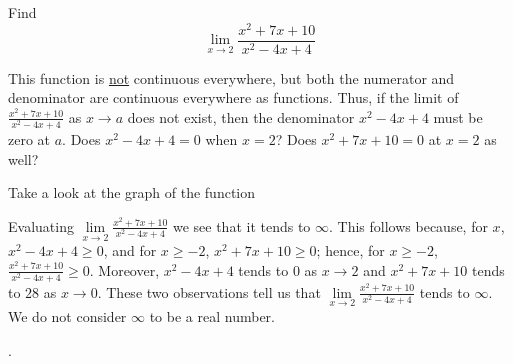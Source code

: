 \documentclass{ximera}
\begin{document}
\begin{question}
  Find 
  \[
  \displaystyle \lim_{x\to 2} \frac{x^2+7x+10}{x^2-4x+4}
  \]
  \begin{solution}
    \begin{hint}
     This function is \underline{not} continuous everywhere, but both the numerator and denominator are continuous everywhere as functions. Thus, if the limit of $\frac{x^2+7x+10}{x^2-4x+4}$ as $x\to{a}$ does not exist, then the denominator $x^2-4x+4$ must be zero at $a$. Does $x^2-4x+4=0$ when $x=2$? Does $x^2+7x+10=0$ at $x=2$ as well?
    \end{hint}
     \begin{hint}
    	Take a look at the graph of the function
    \begin{center}
      \end{center} 
    \end{hint}
    \begin{hint}
     Evaluating $\lim\limits_{x\to2}\frac{x^2+7x+10}{x^2-4x+4}$ we see that it tends to $\infty$. This follows because, for $x$, $x^2-4x+4\ge0$, and for $x\ge-2$, $x^2+7x+10\ge0$; hence, for $x\ge-2$, $\frac{x^2+7x+10}{x^2-4x+4}\ge0$. Moreover, $x^2-4x+4$ tends to $0$ as $x\to{2}$ and $x^2+7x+10$ tends to $28$ as $x\to{0}$. These two observations tell us that  $\lim\limits_{x\to2}\frac{x^2+7x+10}{x^2-4x+4}$ tends to $\infty$. We do not consider $\infty$ to be a real number.
    \end{hint}
    .
  \end{solution}
\end{question}
\end{document}
